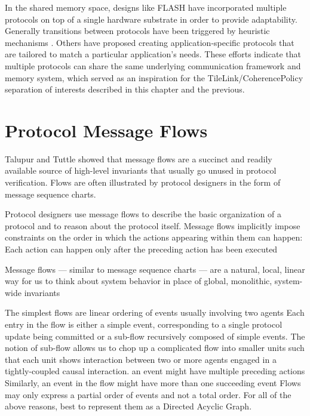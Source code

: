 In the shared memory space, designs like FLASH \cite{kuskin-archnews94} have incorporated multiple protocols on top of a single hardware substrate in order to provide adaptability. Generally transitions between protocols have been triggered by heuristic mechanisms \cite{mukherjee-archnews98}. Others \cite{chandra-sigplan96,falsafi-sc94} have proposed creating application-specific protocols that are tailored to match a particular application's needs.
These efforts indicate that multiple protocols can share the same underlying communication framework and memory system,
which served as an inspiration for the TileLink/CoherencePolicy separation of interests described in this chapter and the previous.

\section{Protocol Message Flows}

Talupur and Tuttle showed that message flows are a succinct and
readily available source of high-level invariants that usually go
unused in protocol verification. 
Flows
are often illustrated by protocol designers in the form of
message sequence charts.

Protocol designers use message flows to describe
the basic organization of a protocol and to reason about the
protocol itself.
Message flows implicitly impose constraints
on the order in which the actions appearing within them can happen:
Each action can happen only after the preceding action has been executed

Message flows — similar to message sequence charts — are a natural,
local, linear way for us to think about system behavior in place
of global, monolithic, system-wide invariants

The simplest flows are linear ordering of events usually involving two agents
Each entry in the flow is either a simple event, 
corresponding to a single protocol update being committed or a sub-flow recursively composed of simple events.
The notion of sub-flow allows us to
chop up a complicated flow into smaller units such that each
unit shows interaction between two or more agents engaged in a tightly-coupled causal interaction.
an event might have multiple preceding actions
Similarly, an event in the flow might have more than one succeeding event
Flows may only express a partial order of events and not a total order.
For all of the above reasons, best to represent them as a Directed Acyclic Graph.

